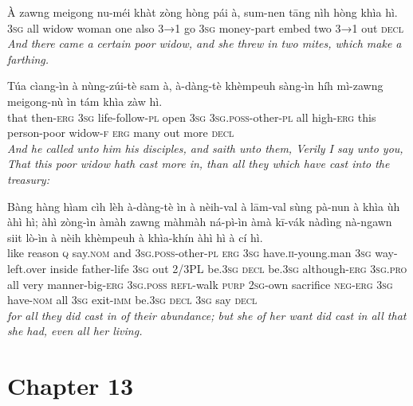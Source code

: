 \documentclass[11pt,a4paper]{article}
\begin{document}
\begin{exe}
\gll À zawng meigong nu-méi khàt zòng hòng pái à, sum-nen tāng nìh hòng khìa hì. \\
     \textsc{3sg} all widow woman one also \textsc{3→1} go \textsc{3sg} money-part embed two \textsc{3→1} out \textsc{decl} \\
\glt \textcolor{kjvcolor}{\textit{And there came a certain poor widow, and she threw in two mites, which make a farthing.}}

\gll Túa cìang-ìn à nùng-zúi-tè sam à, à-dàng-tè khèmpeuh sàng-ìn híh mì-zawng meigong-nù ìn tám khìa zàw hì. \\
     that then-\textsc{erg} \textsc{3sg} life-follow-\textsc{pl} open \textsc{3sg} \textsc{3sg}.\textsc{poss}-other-\textsc{pl} all high-\textsc{erg} this person-poor widow-\textsc{f} \textsc{erg} many out more \textsc{decl} \\
\glt \textcolor{kjvcolor}{\textit{And he called unto him his disciples, and saith unto them, Verily I say unto you, That this poor widow hath cast more in, than all they which have cast into the treasury:}}

\gll Bàng hàng hìam cìh lèh à-dàng-tè ìn à nèih-val à lām-val sùng pà-nun à khìa ùh àhì hì; àhì zòng-ìn àmàh zawng màhmàh ná-pì-ìn àmà kī-vák nàdìng nà-ngawn siit lò-ìn à nèih khèmpeuh à khìa-khín àhì hì à cí hì. \\
     like reason \textsc{q} say.\textsc{nom} and \textsc{3sg}.\textsc{poss}-other-\textsc{pl} \textsc{erg} \textsc{3sg} have.\textsc{ii}-young.man \textsc{3sg} way-left.over inside father-life \textsc{3sg} out 2/3PL be.\textsc{3sg} \textsc{decl} be.\textsc{3sg} although-\textsc{erg} \textsc{3sg}.\textsc{pro} all very manner-big-\textsc{erg} \textsc{3sg}.\textsc{poss} \textsc{refl}-walk \textsc{purp} \textsc{2sg}-own sacrifice \textsc{neg}-\textsc{erg} \textsc{3sg} have-\textsc{nom} all \textsc{3sg} exit-\textsc{imm} be.\textsc{3sg} \textsc{decl} \textsc{3sg} say \textsc{decl} \\
\glt \textcolor{kjvcolor}{\textit{for all they did cast in of their abundance; but she of her want did cast in all that she had, even all her living.}}

\end{exe}
\newpage

\section*{Chapter 13}
\end{document}

